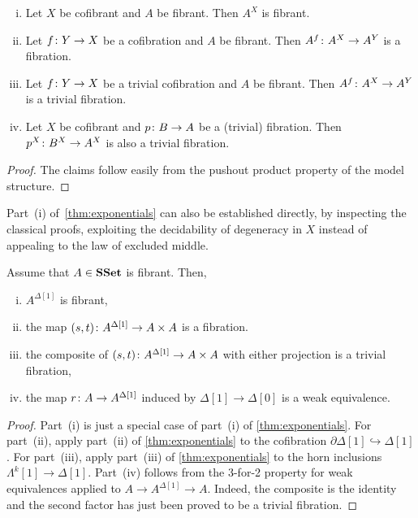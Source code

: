 \documentclass[reqno,10pt,a4paper,oneside,draft]{amsart}
\begin{document}
\begin{lemma} \hfill 
 \label{thm:exponentials}
\begin{enumerate}[(i)] 
\item Let $X$ be cofibrant and $A$ be fibrant.  Then $A^X$ is fibrant.
\item Let $f \colon Y \rightarrow X$ be a cofibration and $A$ be fibrant. Then $A^f \colon A^X \rightarrow A^Y$ is a fibration.
\item Let $f \colon Y \rightarrow X$ be a trivial cofibration and $A$ be fibrant.  Then $A^f \colon A^X \rightarrow A^Y$ is a trivial fibration.
\item Let $X$ be cofibrant and $p \colon B \rightarrow A$ be a (trivial) fibration. Then $p^X \colon B^X \rightarrow A^X$ is also a trivial fibration.
\end{enumerate}
\end{lemma}

\begin{proof} The claims follow easily from the pushout product property of the model structure.
\end{proof}

Part~(i) of~\cref{thm:exponentials} can also be established directly, by inspecting the classical proofs, exploiting the decidability of degeneracy in $X$ instead of appealing to the law of excluded middle.






\medskip



\begin{proposition} \label{thm:id-types-for-types}
Assume that $A \in \mathbf{SSet}$ is fibrant. Then,
\begin{enumerate}[(i)] 
\item $A^{\Delta[1]}$ is fibrant,
\item the map $(s,t) \colon A^{\Delta[1]} \rightarrow A \times A$ is a fibration.
\item the composite of $(s, t) \colon A^{\Delta[1]} \rightarrow A \times A$ with either projection is a trivial fibration,
\item the map $r \colon A \rightarrow A^{\Delta[1]}$ induced by $\Delta[1] \rightarrow \Delta[0]$ is a weak equivalence.
\end{enumerate}
\end{proposition} 

\begin{proof}
Part~(i) is just a special case of part~(i) of \cref{thm:exponentials}. For part~(ii), apply part~(ii) of \cref{thm:exponentials} to the cofibration $\partial \Delta[1]  \hookrightarrow \Delta[1]$. For part~(iii), apply part~(iii) of \cref{thm:exponentials} to the horn inclusions $\Lambda^k[1]  \rightarrow \Delta[1]$. Part~(iv) follows from the 3-for-2 property for weak equivalences applied to $A \rightarrow A^{\Delta[1]} \rightarrow A$. Indeed, the
composite is the identity and the second factor has just been proved to be a trivial fibration.
\end{proof}
\end{document}
